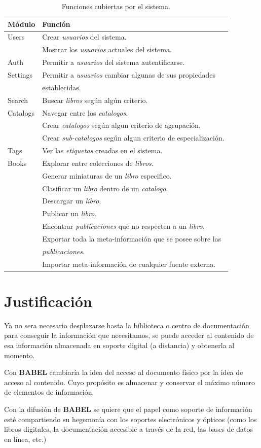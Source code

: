 \documentclass[letter,12pt]{article}
\begin{document}
\begin{table}
\begin{tabular}{l|l}
Módulo & Función \\
\hline
Users    & Crear \emph{usuarios} del sistema.                           \\
	     & Mostrar los \emph{usuarios} actuales del sistema. 			\\
Auth     & Permitir a \emph{usuarios} del sistema autentificarse.       \\
Settings & Permitir a \emph{usuarios} cambiar algunas de sus propiedades \\
	     & establecidas. \\ 
Search   & Buscar \emph{libros} según algún criterio. 					\\
Catalogs & Navegar entre los \emph{catalogos}.		 					\\
	     & Crear \emph{catalogos} según algun criterio de agrupación.   \\
	     & Crear \emph{sub-catalogos} según algun criterio de especialización. \\
Tags     & Ver las \emph{etiquetas} creadas en el sistema. 				\\
Books    & Explorar entre colecciones de \emph{libros}. 				\\
	     & Generar miniaturas de un \emph{libro} especifico.			\\
	     & Clasificar un \emph{libro} dentro de un \emph{catalogo}.     \\
	     & Descargar un \emph{libro}.									\\
	     & Publicar un \emph{libro}.                                    \\
	     & Encontrar \emph{publicaciones} que no respecten a un \emph{libro}. \\
	     & Exportar toda la meta-información que se posee sobre las     \\
	     & \emph{publicaciones}. \\
	     & Importar meta-información de cualquier fuente externa.       \\
\end{tabular}
\caption{Funciones cubiertas por el sistema.}
\label{funciones_actuales}
\end{table}

\section{Justificación}
Ya no sera necesario desplazarse hasta la biblioteca o centro de documentación para conseguir la
información que necesitamos, se puede acceder al contenido de esa información almacenada en
soporte digital (a distancia) y obtenerla al momento.

Con {\bf BABEL} cambiaría la idea del acceso al documento físico por la idea de acceso al
contenido. Cuyo propósito es almacenar y conservar el máximo número de elementos de información.

Con la difusión de {\bf BABEL} se quiere que el papel como soporte de información esté
compartiendo su hegemonía con los soportes electrónicos y ópticos (como los libros digitales, la
documentación accesible a través de la red, las bases de datos en línea, etc.)
\end{document}
